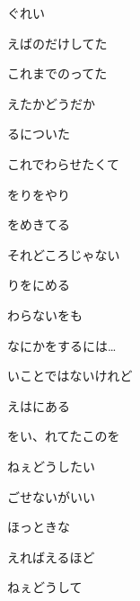 \documentclass[a4paper,tate,twocolumn,12pt]{ltjtarticle}
\begin{document}
\thispagestyle{empty}

\begin{center}
{\LARGE {}ぐれい}
\end{center}

\vspace{1em}

\begin{flushleft}

\noindent\begin{minipage}{\linewidth}
えばのだけしてた

これまでのってた

えたかどうだか

るについた

これでわらせたくて

をりをやり

をめきてる
\end{minipage}

\vspace{2em}

\noindent\begin{minipage}{\linewidth}

それどころじゃない

りをにめる

わらないをも

なにかをするには…

いことではないけれど

えはにある

をい、れてたこのを
\end{minipage}

\vspace{2em}

\noindent\begin{minipage}{\linewidth}
ねぇどうしたい

ごせないがいい

ほっときな

えればえるほど

ねぇどうして


\end{minipage}
\end{flushleft}
\end{document}
